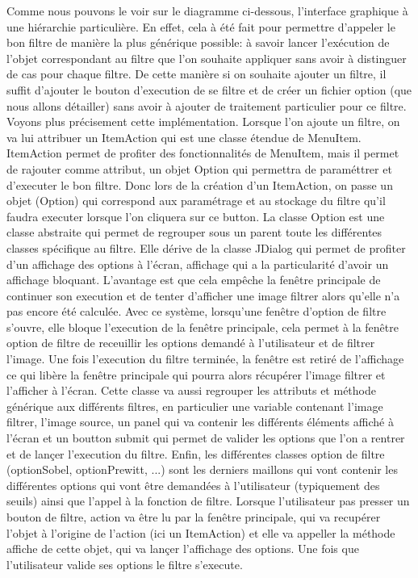 \documentclass[twoside,openright,a4paper,11pt,french]{article}
\begin{document}
Comme nous pouvons le voir sur le diagramme ci-dessous, l'interface graphique à une hiérarchie
particulière. En effet, cela à été fait pour permettre d'appeler le bon filtre de manière la
plus générique possible: à savoir lancer l'exécution de l'objet correspondant au filtre que l'on
souhaite appliquer sans avoir à distinguer de cas pour chaque filtre.
De cette manière si on souhaite ajouter un filtre, il suffit d'ajouter le bouton d'execution de
se filtre et de créer un fichier option (que nous allons détailler) sans avoir à ajouter de traitement
particulier pour ce filtre. Voyons plus précisement cette implémentation.
Lorsque l'on ajoute un filtre, on va lui attribuer un ItemAction qui est une classe étendue de MenuItem.
ItemAction permet de profiter des fonctionnalités de MenuItem, mais il permet de rajouter comme attribut,
un objet Option qui permettra de paraméttrer et d'executer le bon filtre. Donc lors de la création d'un
ItemAction, on passe un objet (Option) qui correspond aux paramétrage et au stockage du filtre qu'il faudra
executer lorsque l'on cliquera sur ce button.
La classe Option est une classe abstraite qui permet de regrouper sous un parent toute les différentes classes
spécifique au filtre. Elle dérive de la classe JDialog qui permet de profiter d'un affichage des options à
l'écran, affichage qui a la particularité d'avoir un affichage bloquant. L'avantage est que cela empêche la
fenêtre principale de continuer son execution et de tenter d'afficher une image filtrer alors qu'elle n'a pas
encore été calculée. Avec ce système, lorsqu'une fenêtre d'option de filtre s'ouvre, elle bloque l'execution
de la fenêtre principale, cela permet à la fenêtre option de filtre de receuillir les options demandé à
l'utilisateur et de filtrer l'image. Une fois l'execution du filtre terminée, la fenêtre est retiré de l'affichage
ce qui libère la fenêtre principale qui pourra alors récupérer l'image filtrer et l'afficher à l'écran.
Cette classe va aussi regrouper les attributs et méthode générique aux différents filtres, en particulier une
variable contenant l'image filtrer, l'image source, un panel qui va contenir les différents
éléments affiché à l'écran et un boutton submit qui permet de valider
les options que l'on a rentrer et de lançer l'execution du filtre.
Enfin, les différentes classes option de filtre (optionSobel, optionPrewitt, ...) sont les derniers maillons qui
vont contenir les différentes options qui vont être demandées à l'utilisateur (typiquement des seuils) ainsi que
l'appel à la fonction de filtre.
Lorsque l'utilisateur pas presser un bouton de filtre, action va être lu par la fenêtre principale, qui va recupérer l'objet 
à l'origine de l'action (ici un ItemAction) et elle va appeller la méthode affiche de cette objet, qui va lançer l'affichage
des options. Une fois que l'utilisateur valide ses options le filtre s'execute.
\end{document}
